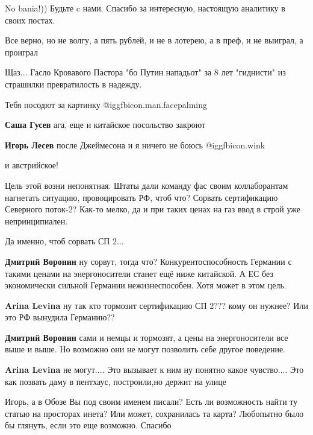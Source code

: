 \begin{itemize}
\begin{itemize}
No bania!)) Будьте c нами. Спасибо за интересную, настоящую аналитику в своих постах.
\end{itemize} %

Все верно, но не волгу, а пять рублей, и не в лотерею, а в преф, и не выиграл, а проиграл

Щаз... Гасло Кровавого Пастора "бо Путин нападьот" за 8 лет "гиднисти" из страшилки превратилость в надежду.

Тебя посодют за картинку @igg{fbicon.man.facepalming} 

\begin{itemize} %
\textbf{Саша Гусев} ага, еще и китайское посольство закроют

\textbf{Игорь Лесев} после Джеймесона и я ничего не боюсь @igg{fbicon.wink} 

и австрийское!
\end{itemize} %


Цель этой возни непонятная. Штаты дали команду фас своим коллаборантам
нагнетать ситуацию, провоцировать РФ, чтоб что? Сорвать сертификацию Северного
поток-2? Как-то мелко, да и при таких ценах на газ ввод в строй уже
непринципиален.

\begin{itemize} %
Да именно, чтоб сорвать СП 2...

\textbf{Дмитрий Воронин} ну сорвут, тогда что? Конкурентоспособность Германии с такими ценами на энергоносители станет ещё ниже китайской. А ЕС без экономически сильной Германии нежизнеспособен. Хотя может в этом цель.

\textbf{Arina Levina} ну так кто тормозит сертификацию СП 2??? кому он нужнее? Или это РФ вынудила Германию??

\textbf{Дмитрий Воронин} сами и немцы и тормозят, а цены на энергоносители все выше и выше. Но возможно они не могут позволить себе другое поведение.

\textbf{Arina Levina} не могут.... Это вызывает к ним ну понятно какое чувство....
Это как позвать даму в пентхаус, построили,но держит на улице
\end{itemize} %


Игорь, а в Обозе Вы под своим именем писали? Есть ли возможность найти ту
статью на просторах инета? Или может, сохранилась та карта? Любопытно было бы
глянуть, если это еще возможно. Спасибо


\end{itemize}
